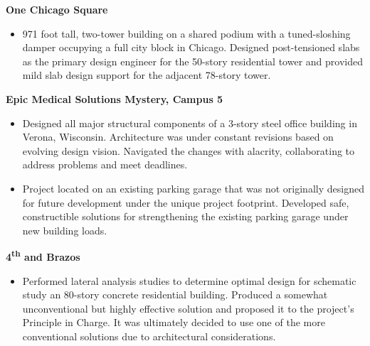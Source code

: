 \documentclass[letterpaper,6pt]{article}
\begin{document}
\textbf{\small{One Chicago Square}}
\begin{itemize}[itemsep=0.5mm,topsep=0pt]
    \item  971 foot tall, two-tower building on a shared podium with a tuned-sloshing 
    damper occupying a full city block in Chicago. Designed post-tensioned slabs as 
    the primary design engineer for the 50-story residential tower and provided mild slab 
    design support for the adjacent 78-story tower.
\end{itemize}
\vspace{1mm}
\textbf{\small{Epic Medical Solutions \textbar{} Mystery, Campus 5}}
\begin{itemize}[itemsep=0.5mm,topsep=0pt]
    \item  Designed all major structural components of a 3-story steel office 
    building in Verona, Wisconsin. Architecture was under constant revisions based on 
    evolving design vision. 
    Navigated the changes with alacrity, collaborating to address problems and meet 
    deadlines.
    \item  Project located on an existing parking garage that was not originally designed 
    for future development under the unique project footprint. Developed safe, 
    constructible solutions for strengthening the existing parking garage under new 
    building loads. 
\end{itemize}
\vspace{1mm}
\textbf{\small{4\textsuperscript{th} and Brazos}}
\begin{itemize}[itemsep=0.5mm,topsep=0pt]
    \item  Performed lateral analysis studies to determine optimal 
    design for schematic study an 80-story concrete residential building. Produced a 
    somewhat unconventional but highly effective solution and proposed it to the 
    project's Principle in Charge. It was ultimately decided to use one of the more 
    conventional solutions due to architectural considerations.
\end{itemize}
\end{document}
